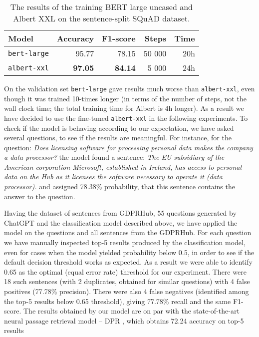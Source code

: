 \begin{table}[htbp]
    \centering\begin{tabular}{l r r r r}
        \hline
        \textbf{Model} & \textbf{Accuracy} & \textbf{F1-score} & \textbf{Steps} & \textbf{Time} \\
        \hline
        \texttt{bert-large} & 95.77 & 78.15 & 50 000 & 20h \\
        \hline
        \texttt{albert-xxl} & \textbf{97.05} & \textbf{84.14} & 5 000 & 24h \\
        \hline
    \end{tabular}
    \caption{The results of the training BERT large uncased and Albert XXL on the sentence-split SQuAD dataset.}
    \label{tab:bert-albert}
\end{table}

On the validation set \texttt{bert-large} gave results much worse than \texttt{albert-xxl}, even though it was trained 10-times longer 
(in terms of the number of steps, not the wall clock time; the total training time for Albert is 4h longer). 
As a result we have decided to use the fine-tuned \texttt{albert-xxl} 
in the following experiments. To check if the model is behaving according to our expectation, we have asked several questions,
to see if the results are meaningful. For instance, for the question: \textit{Does licensing software for processing personal data 
makes the company a data processor?} the model found a sentence: \textit{The EU subsidiary of the American corporation Microsoft, 
established in Ireland, has access to personal data on the Hub as it licenses the software necessary to operate it (data processor).}
and assigned 78.38\% probability, that this sentence contains the answer to the question.

Having the dataset of sentences from GDPRHub, 55 questions generated by ChatGPT and the classification model described above,
we have applied the model on the questions and all sentences from the GDPRHub. For each question we have manually inspected top-5 results
produced by the classification model, even for cases when the model yielded probability below 0.5, in order to see if the default
decision threshold works as expected. As a result we were able to identify 0.65 as the optimal (equal error rate) threshold for our 
experiment. There were 18 such sentences (with 2 duplicates, obtained for similar questions) with 4 false positives (77.78\% precision).
There were also 4 false negatives (identified among the top-5 results below 0.65 threshold), giving 77.78\% recall and the same F1-score. 
The results obtained by our model are on par with the state-of-the-art neural passage retrieval model -- DPR \cite{karpukhin2020dense},
which obtains 72.24 accuracy on top-5 results